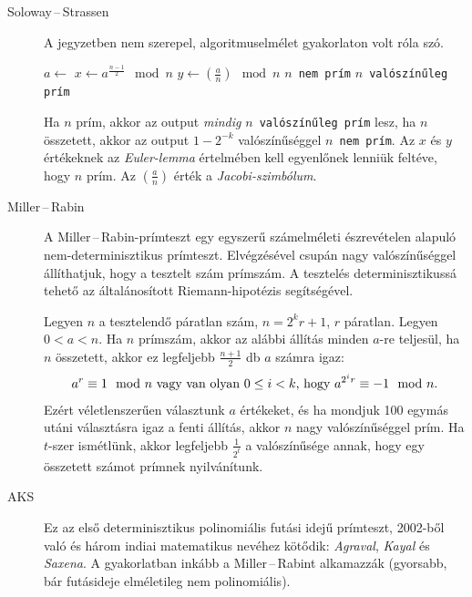 \documentclass[%
	DIV=15,appendixprefix]{scrreprt}
\theoremstyle{definition}
\theoremstyle{remark}
\begin{document}
\begin{description}
	\item[Soloway\,--\,Strassen] A jegyzetben nem szerepel, algoritmuselmélet gyakorlaton volt róla
		szó.
		\begin{algorithmic}[1]
				\State $ a \gets $ 
				\State $ x \gets a^{ \frac{ n - 1 }{ 2 } } \mod{ n }$
				\State $y \gets \left( \frac{ a }{ n }  \right) \mod{n}$
					\State \Return \texttt{$ n $ nem prím}
				\EndIf
			\EndFor
			\State \Return \texttt{$ n $ valószínűleg prím}
		\end{algorithmic}
		Ha $ n $ prím, akkor az output \emph{mindig} \texttt{$ n $ valószínűleg prím} lesz, ha $ n $
		összetett, akkor az output $ 1 - 2^{ - k } $ valószínűséggel \texttt{$ n $ nem prím}. Az
		$ x $ és $ y $ értékeknek az \emph{Euler-lemma} értelmében kell egyenlőnek lenniük feltéve,
		hogy $ n $ prím. Az $ \left( \frac{ a }{ n } \right) $ érték a \emph{Jacobi-szimbólum}.

	\item[Miller\,--\,Rabin] A Miller\,--\,Rabin-prímteszt egy egyszerű számelméleti észrevételen
		alapuló nem-determinisztikus prímteszt. Elvégzésével csupán nagy valószínűséggel
		állíthatjuk, hogy  a tesztelt szám prímszám. A tesztelés determinisztikussá tehető az
		általánosított Riemann-hipotézis segítségével.

		Legyen $ n $ a tesztelendő páratlan szám, $ n = 2^{ k } r + 1 $, $ r $ páratlan. Legyen
		$ 0 < a < n $. Ha $ n $ prímszám, akkor az alábbi állítás minden $ a $-re teljesül, ha $ n $
		összetett, akkor ez legfeljebb $ \frac{ n+ 1 }{ 2 } $ db $ a $ számra igaz:
		\begin{equation*}
			a^{r}\equiv 1 \mod{n}\  \text{vagy van olyan $ 0 \le i < k $, hogy}\ a^{ 2^{ i } r }
			\equiv - 1 \mod{n}.
		\end{equation*}
		Ezért véletlenszerűen választunk $ a $ értékeket, és ha mondjuk 100 egymás utáni választásra
		igaz a fenti állítás, akkor $ n $ nagy valószínűséggel prím. Ha $ t $-szer ismétlünk, akkor
		legfeljebb $ \frac{ 1 }{ 2^{ t } } $ a valószínűsége annak, hogy egy összetett számot
		prímnek nyilvánítunk.
	\item[AKS] Ez az első determinisztikus polinomiális futási idejű prímteszt, 2002-ből való és
		három indiai matematikus nevéhez kötődik: \emph{Agraval}, \emph{Kayal} és \emph{Saxena}. A
		gyakorlatban inkább a Miller\,--\,Rabint alkamazzák (gyorsabb, bár futásideje elméletileg
		nem polinomiális).


\end{description}
\end{document}

